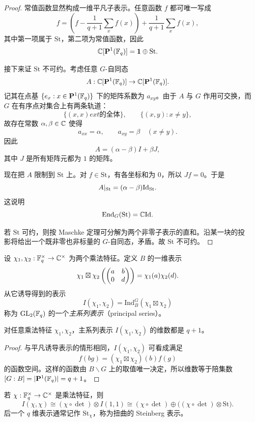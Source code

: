 \begin{proof}
常值函数显然构成一维平凡子表示。任意函数 $f$ 都可唯一写成
\[
f=\left(f-\frac{1}{q+1}\sum_x f(x)\right)+\frac{1}{q+1}\sum_x f(x),
\]
其中第一项属于 $\mathrm{St}$，第二项为常值函数，因此
\[
\mathbb{C}[\mathbf{P}^1(\mathbb{F}_q)]=\mathbf{1}\oplus \mathrm{St}.
\]

接下来证 $\mathrm{St}$ 不可约。考虑任意 $G$-自同态
\[
A:\mathbb{C}[\mathbf{P}^1(\mathbb{F}_q)]\to \mathbb{C}[\mathbf{P}^1(\mathbb{F}_q)].
\]
记其在点基 $\{e_x:x\in \mathbf{P}^1(\mathbb{F}_q)\}$ 下的矩阵系数为 $a_{xy}$。由于 $A$ 与 $G$ 作用可交换，而 $G$ 在有序点对集合上有两条轨道：
\[
\{(x,x)	ext{ 的全体}\},\qquad \{(x,y):x\neq y\},
\]
故存在常数 $\alpha,\beta\in \mathbb{C}$ 使得
\[
a_{xx}=\alpha,\qquad a_{xy}=\beta\quad (x\neq y).
\]
因此
\[
A=(\alpha-\beta)I+\beta J,
\]
其中 $J$ 是所有矩阵元都为 $1$ 的矩阵。

现在把 $A$ 限制到 $\mathrm{St}$ 上。对 $f\in \mathrm{St}$，有各坐标和为 $0$，所以 $Jf=0$。于是
\[
A|_{\mathrm{St}}=(\alpha-\beta)\mathrm{Id}_{\mathrm{St}}.
\]
这说明
\[
\mathrm{End}_G(\mathrm{St})=\mathbb{C}\mathrm{Id}.
\]

若 $\mathrm{St}$ 可约，则按 Maschke 定理可分解为两个非零子表示的直和。沿某一块的投影将给出一个既非零也非标量的 $G$-自同态，矛盾。故 $\mathrm{St}$ 不可约。
\end{proof}

\begin{definition}
设 $\chi_1,\chi_2:\mathbb{F}_q^{\times}\to \mathbb{C}^{\times}$ 为两个乘法特征。定义 $B$ 的一维表示
\[
\chi_1\boxtimes \chi_2\left(\begin{pmatrix} a&b\\0&d \end{pmatrix}\right)=\chi_1(a)\chi_2(d).
\]
从它诱导得到的表示
\[
I(\chi_1,\chi_2)=\mathrm{Ind}_B^G(\chi_1\boxtimes \chi_2)
\]
称为 $\mathrm{GL}_2(\mathbb{F}_q)$ 的一个\emph{主系列表示}（principal series）。
\end{definition}

\begin{proposition}
对任意乘法特征 $\chi_1,\chi_2$，主系列表示 $I(\chi_1,\chi_2)$ 的维数都是 $q+1$。
\end{proposition}

\begin{proof}
与平凡诱导表示的情形相同，$I(\chi_1,\chi_2)$ 可看成满足
\[
 f(bg)=(\chi_1\boxtimes\chi_2)(b)f(g)
\]
的函数空间。这样的函数由 $B\backslash G$ 上的取值唯一决定，所以维数等于陪集数 $[G:B]=|\mathbf{P}^1(\mathbb{F}_q)|=q+1$。
\end{proof}

\begin{proposition}
若 $\chi:\mathbb{F}_q^{\times}\to \mathbb{C}^{\times}$ 是乘法特征，则
\[
I(\chi,\chi)\cong (\chi\circ \det)\otimes I(1,1)
\cong (\chi\circ \det)\oplus \bigl((\chi\circ \det)\otimes \mathrm{St}\bigr).
\]
后一个 $q$ 维表示通常记作 $\mathrm{St}_\chi$，称为扭曲的 Steinberg 表示。
\end{proposition}

